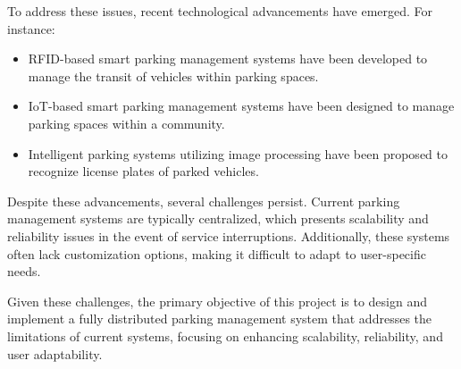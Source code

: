 To address these issues, recent technological advancements have emerged. For instance:
\begin{itemize}
\item RFID-based smart parking management systems \autocite{rfid_smart_parking_management_system} have been developed to manage the transit of vehicles within parking spaces.
\item IoT-based smart parking management systems \autocite{development_smart_parking_management_system} have been designed to manage parking spaces within a community.
\item Intelligent parking systems utilizing image processing \autocite{intelligent_parking_system_image_processing} have been proposed to recognize license plates of parked vehicles.
\end{itemize}

Despite these advancements, several challenges persist. Current parking management systems are typically centralized, which presents scalability and reliability issues in the event of service interruptions. Additionally, these systems often lack customization options, making it difficult to adapt to user-specific needs.

Given these challenges, the primary objective of this project is to design and implement a fully distributed parking management system that addresses the limitations of current systems, focusing on enhancing scalability, reliability, and user adaptability.
